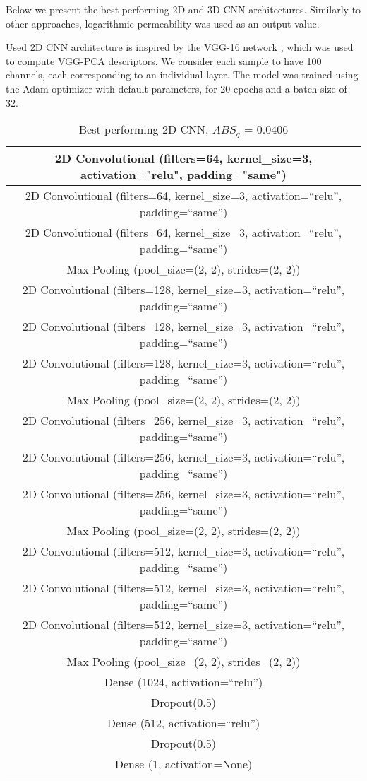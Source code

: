 \documentclass[review]{elsarticle}
\begin{document}
Below we present the best performing 2D and 3D CNN architectures. Similarly to other approaches, logarithmic permeability was used as an output value. 

Used 2D CNN architecture is inspired by the VGG-16 network \cite{lecun2015deep}, which was used to compute VGG-PCA descriptors. We consider each sample to have 100 channels, each corresponding to an individual layer. The model was trained using the Adam optimizer with default parameters, for 20 epochs and a batch size of 32.

\begin{table}[H]
  \centering
  \caption{Best performing 2D CNN, $ABS_q$ = 0.0406} \label{tab:tab7}
  \begin{tabular}{ | c |}
    \hline
    2D Convolutional (filters=64, kernel\_size=3, activation="relu", padding="same") \\ \hline
    2D Convolutional (filters=64, kernel\_size=3, activation=“relu”, padding=“same”) \\ \hline
    2D Convolutional (filters=64, kernel\_size=3, activation=“relu”, padding=“same”) \\ \hline
    Max Pooling (pool\_size=(2, 2), strides=(2, 2)) \\ \hline
    2D Convolutional (filters=128, kernel\_size=3, activation=“relu”, padding=“same”) \\ \hline
    2D Convolutional (filters=128, kernel\_size=3, activation=“relu”, padding=“same”) \\ \hline
    2D Convolutional (filters=128, kernel\_size=3, activation=“relu”, padding=“same”) \\ \hline
    Max Pooling (pool\_size=(2, 2), strides=(2, 2)) \\ \hline
    2D Convolutional (filters=256, kernel\_size=3, activation=“relu”, padding=“same”) \\ \hline
    2D Convolutional (filters=256, kernel\_size=3, activation=“relu”, padding=“same”) \\ \hline
    2D Convolutional (filters=256, kernel\_size=3, activation=“relu”, padding=“same”) \\ \hline
    Max Pooling (pool\_size=(2, 2), strides=(2, 2)) \\ \hline
    2D Convolutional (filters=512, kernel\_size=3, activation=“relu”, padding=“same”) \\ \hline
    2D Convolutional (filters=512, kernel\_size=3, activation=“relu”, padding=“same”) \\ \hline
    2D Convolutional (filters=512, kernel\_size=3, activation=“relu”, padding=“same”) \\ \hline
    Max Pooling (pool\_size=(2, 2), strides=(2, 2)) \\ \hline
    Dense (1024, activation=“relu”) \\ \hline
    Dropout(0.5) \\ \hline
    Dense (512, activation=“relu”) \\ \hline
    Dropout(0.5) \\ \hline
    Dense (1, activation=None) \\ \hline
  \end{tabular}
\end{table}
\end{document}
